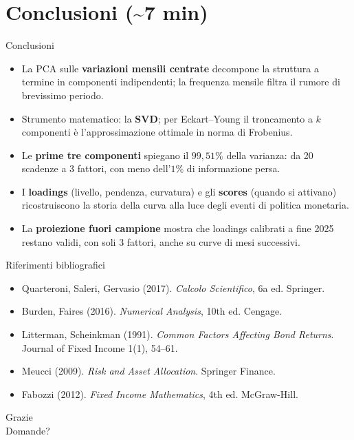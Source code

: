 \documentclass[11pt,aspectratio=169]{beamer}
\begin{document}
\section{Conclusioni (\textasciitilde7 min)}

\begin{frame}{Conclusioni}
\begin{itemize}
  \item La PCA sulle \textbf{variazioni mensili centrate} decompone la struttura a termine
        in componenti indipendenti; la frequenza mensile filtra il rumore di brevissimo
        periodo.
  \item Strumento matematico: la \textbf{SVD}; per Eckart--Young il troncamento a $k$
        componenti è l'approssimazione ottimale in norma di Frobenius.
  \item Le \textbf{prime tre componenti} spiegano il $99{,}51\%$ della varianza: da 20
        scadenze a 3 fattori, con meno dell'$1\%$ di informazione persa.
  \item I \textbf{loadings} (livello, pendenza, curvatura) e gli \textbf{scores} (quando si
        attivano) ricostruiscono la storia della curva alla luce degli eventi di politica
        monetaria.
  \item La \textbf{proiezione fuori campione} mostra che loadings calibrati a fine 2025
        restano validi, con soli 3 fattori, anche su curve di mesi successivi.
\end{itemize}
\end{frame}

\begin{frame}{Riferimenti bibliografici}
\small
\begin{itemize}
  \item Quarteroni, Saleri, Gervasio (2017). \textit{Calcolo Scientifico}, 6a ed. Springer.
  \item Burden, Faires (2016). \textit{Numerical Analysis}, 10th ed. Cengage.
  \item Litterman, Scheinkman (1991). \textit{Common Factors Affecting Bond Returns}.
        Journal of Fixed Income 1(1), 54--61.
  \item Meucci (2009). \textit{Risk and Asset Allocation}. Springer Finance.
  \item Fabozzi (2012). \textit{Fixed Income Mathematics}, 4th ed. McGraw-Hill.
\end{itemize}
\end{frame}

\begin{frame}[plain]
\vfill
\begin{center}
{\Huge Grazie}\\[10pt]
{\Large Domande?}
\end{center}
\vfill
\end{frame}
\end{document}
